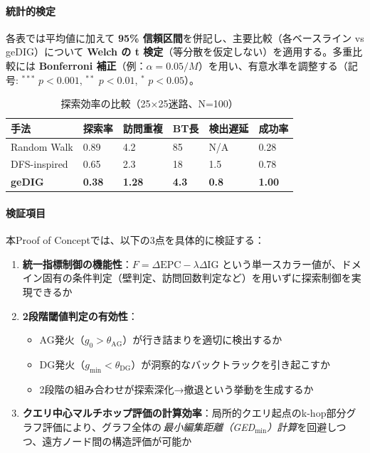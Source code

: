 \documentclass[ja=standard,xelatex]{bxjsarticle}
\begin{document}
\paragraph{統計的検定}
各表では平均値に加えて \textbf{95\% 信頼区間}を併記し、主要比較（各ベースライン vs geDIG）について \textbf{Welch の t 検定}（等分散を仮定しない）を適用する。多重比較には \textbf{Bonferroni 補正}（例：$\alpha{=}0.05/M$）を用い、有意水準を調整する（記号: $^{***}$ $p{<}0.001$, $^{**}$ $p{<}0.01$, $^{*}$ $p{<}0.05$）。

\begin{table}[H]
\centering
\small
\caption{探索効率の比較（25×25迷路、N=100）}
\label{tab:exploration_efficiency}
\begin{tabular}{@{}l p{1.6cm} p{1.6cm} p{1.6cm} p{1.2cm} p{1.8cm}@{}}
\toprule
手法 & 探索率 & 訪問重複 & BT長 & 検出遅延 & 成功率 \\
\midrule
Random Walk & 0.89 & 4.2 & 85 & N/A & 0.28 \\
DFS-inspired & 0.65 & 2.3 & 18 & 1.5 & 0.78 \\
\textbf{geDIG} & \textbf{0.38} & \textbf{1.28} & \textbf{4.3} & \textbf{0.8} & \textbf{1.00} \\
\bottomrule
\end{tabular}
\end{table}


\paragraph{検証項目}
本Proof of Conceptでは、以下の3点を具体的に検証する：

\begin{enumerate}
  \item \textbf{統一指標制御の機能性}：$F = \Delta\mathrm{EPC} - \lambda\Delta\mathrm{IG}$ という単一スカラー値が、ドメイン固有の条件判定（壁判定、訪問回数判定など）を用いずに探索制御を実現できるか

  \item \textbf{2段階閾値判定の有効性}：
  \begin{itemize}
    \item AG発火（$g_0 > \theta_{\mathrm{AG}}$）が行き詰まりを適切に検出するか
    \item DG発火（$g_{\min} < \theta_{\mathrm{DG}}$）が洞察的なバックトラックを引き起こすか
    \item 2段階の組み合わせが探索深化→撤退という挙動を生成するか
  \end{itemize}

  \item \textbf{クエリ中心マルチホップ評価の計算効率}：局所的クエリ起点のk-hop部分グラフ評価により、グラフ全体の\,\emph{最小編集距離（GED$_{\min}$）計算}を回避しつつ、遠方ノード間の構造評価が可能か
\end{enumerate}
\end{document}
